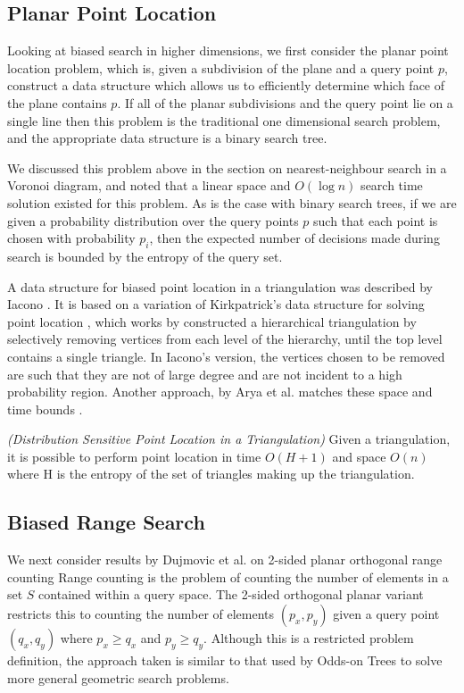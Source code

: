 \documentclass[mcs]{scsthesis}
\begin{document}
\subsection{Planar Point Location}

Looking at biased search in higher dimensions, we first consider the planar
point location problem, which is, given a subdivision of the plane and a
query point \(p\), construct a data structure which allows us to efficiently
determine which face of the plane contains \(p\). If all of the planar
subdivisions and the query point lie on a single line then this problem is the
traditional one dimensional search problem, and the appropriate data structure
is a binary search tree.

We discussed this problem above in the section on nearest-neighbour
search in a Voronoi diagram, and noted that a linear space and \(O(\log n)\)
search time solution existed for this problem.  As is the case with binary
search trees, if we are given a probability distribution over the query points
\(p\) such that each point is chosen with probability \(p_i\), then the
expected number of decisions made during search is bounded by the entropy of
the query set.

A data structure for biased point location in a triangulation was described
by Iacono \cite{iacono}. It is based on a variation of Kirkpatrick's data
structure for solving point location \cite{kirkpatrick}, which works by
constructed a hierarchical triangulation by selectively removing vertices
from each level of the hierarchy, until the top level contains a single triangle.
In Iacono's version, the vertices chosen to be removed are such that they are
not of large degree and are not incident to a high probability region. Another
approach, by Arya et al. matches these space and time bounds \cite{simpleentropy}.

\begin{thm} \emph{(Distribution Sensitive Point Location in a Triangulation)} 
Given a triangulation, it is possible to perform point location in time
\(O(H + 1)\) and space \(O(n)\) where H is the entropy of the set of triangles
making up the triangulation. 
\end{thm}

\subsection{Biased Range Search}

We next consider results by Dujmovic et al. \cite{biasedrange} on 2-sided
planar orthogonal range counting Range counting is the problem of counting the
number of elements in a set \(S\) contained within a query space. The 2-sided
orthogonal planar variant restricts this to counting the number of elements
\((p_x, p_y)\) given a query point \((q_x, q_y)\) where \(p_x \ge q_x\) and
\(p_y \ge q_y\). Although this is a restricted problem definition, the approach
taken is similar to that used by Odds-on Trees to solve more general geometric 
search problems.
\end{document}

